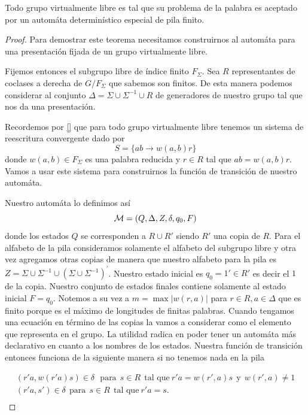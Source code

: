 \documentclass[tesis.tex]{subfiles}
\begin{document}
\begin{teo}
	Todo grupo virtualmente libre es tal que su problema de la palabra es aceptado por un automáta determinístico especial de pila finito.
\end{teo}
\begin{proof}
	Para demostrar este teorema necesitamos construirnos al automáta para una presentación fijada de un grupo virtualmente libre.
	
	Fijemos entonces el subgrupo libre de índice finito $F_\Sigma$. 
	Sea $R$ representantes de coclases a derecha de $G/F_\Sigma$ que sabemos son finitos. 
	De esta manera podemos considerar al conjunto  $\Delta = \Sigma \cup \Sigma^{-1} \cup R$ de generadores de nuestro grupo tal que nos da una presentación.
	
	Recordemos por \ref{} que para todo grupo virtualmente libre tenemos un sistema de reescritura convergente dado por 
	\[
	S = \{ ab \to w(a,b)r  \}
	\] 
	donde $w(a,b) \in F_\Sigma$ es una palabra reducida y $r \in R$ tal que $ab = w(a,b)r$. Vamos a usar este sistema para construirnos la función de transición de nuestro automáta. 
	
	Nuestro automáta lo definimos así 
	\[
	{\cal M }= (Q,\Delta, Z, \delta, q_0, F)
	\]
	donde los estados $Q$ se corresponden a $R \cup R'$ siendo $R'$ una copia de $R$. 
	Para el alfabeto de la pila consideramos solamente el alfabeto del subgrupo libre y otra vez agregamos otras copias de manera que nuestro alfabeto para la pila es $Z = \Sigma \cup \Sigma^{-1} \cup (\Sigma \cup \Sigma^{-1})^{'}$. 
	Nuestro estado inicial es $q_0 = 1' \in R'$ es decir el $1$ de la copia. Nuestro conjunto de estados finales contiene solamente al estado inicial $F=q_0$. 
	Notemos a su vez a $m = \max {|w(r,a)|}$ para $r \in R, a \in \Delta$ que es finito porque es el máximo de longitudes de finitas palabras. 
	Cuando tengamos una ecuación en término de las copias la vamos a considerar como el elemento que representa en el grupo. 
	La utilidad radica en poder tener un automáta más declarativo en cuanto a los nombres de los estados. 
	Nuestra función de transición entonces funciona de la siguiente manera si no tenemos nada en la pila
	
	\begin{align*}
		(r'a,w(r'a)s) \in \delta  \ \ \ \text{para} \ \  s \in R \ \ \text{tal que} \ r'a=w(r',a)s \ \ \text{y} \ \ w(r',a) \neq 1  \\
		(r'a,s') \in \delta  \ \ \text{para} \ \  s \in R \ \ \text{tal que} \ r'a=s.  \\ 
	\end{align*}
	

\end{proof}
\end{document}

